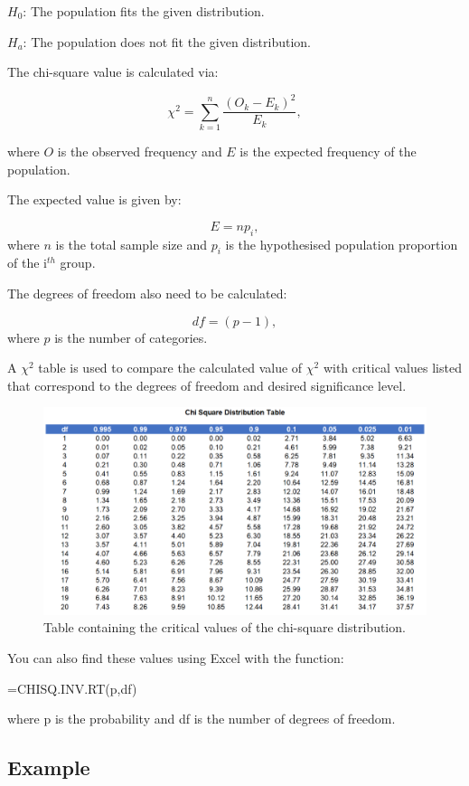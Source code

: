 \documentclass[
]{book}
\begin{document}
\(H_0\): The population fits the given distribution.

\(H_a\): The population does not fit the given distribution.

The chi-square value is calculated via:

\[\chi^2=\sum_{k=1}^{n}\frac{(O_k-E_k)^2}{E_k},\]

where \(O\) is the observed frequency and \(E\) is the expected frequency of the population.

The expected value is given by:

\[E=np_i,\]
where \(n\) is the total sample size and \(p_i\) is the hypothesised population proportion of the i\(^{th}\) group.

The degrees of freedom also need to be calculated:

\[df=(p-1),\]
where \(p\) is the number of categories.

A \(\chi^2\) table is used to compare the calculated value of \(\chi^2\) with critical values listed that correspond to the degrees of freedom and desired significance level.

\begin{figure}
\centering
\includegraphics{chisquare.png}
\caption{Table containing the critical values of the chi-square distribution.}
\end{figure}

You can also find these values using Excel with the function:

=CHISQ.INV.RT(p,df)

where p is the probability and df is the number of degrees of freedom.

\hypertarget{example-13}{%
\subsection{Example}\label{example-13}}
\end{document}
